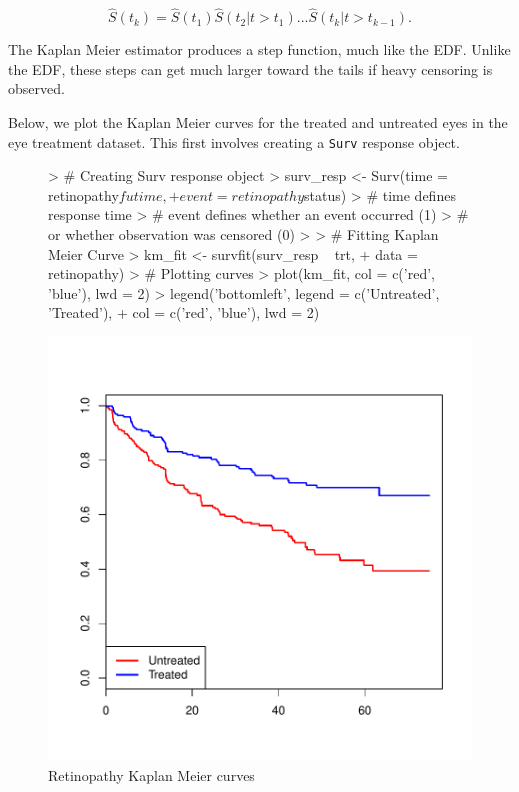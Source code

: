 \documentclass[a4paper]{article}
\begin{document}
    \[
    \hat S(t_k) = \hat S(t_1) \hat S(t_2| t > t_1) ... \hat S(t_k| t > t_{k-1}).
    \]
    
    The Kaplan Meier estimator produces a step function, much like the EDF. Unlike the EDF, these steps can get much larger toward the tails if heavy censoring is observed. 
    
    Below, we plot the Kaplan Meier curves for the treated and untreated eyes in the eye treatment dataset. This first involves creating a \texttt{Surv} response object. 

\begin{figure}    
\begin{center}    
\begin{Schunk}
\begin{Sinput}
> # Creating Surv response object
> surv_resp <- Surv(time = retinopathy$futime,
+                     event = retinopathy$status)
> # time defines response time
> # event defines whether an event occurred (1)
> # or whether observation was censored (0)
> 
> # Fitting Kaplan Meier Curve
> km_fit <- survfit(surv_resp ~ trt, 
+                   data = retinopathy)
> # Plotting curves
> plot(km_fit, col = c('red', 'blue'), lwd = 2)
> legend('bottomleft', legend = c('Untreated', 'Treated'),
+        col = c('red', 'blue'), lwd = 2)
\end{Sinput}
\end{Schunk}
\includegraphics{StatisticalBackground-003}
\caption{Retinopathy Kaplan Meier curves}
\label{fig:retinoKM}
\end{center}
\end{figure}
\end{document}
